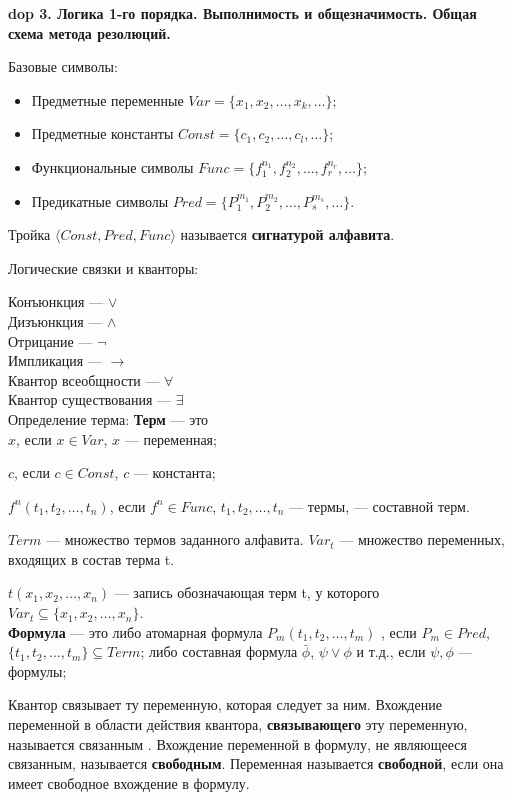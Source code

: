 \textbf{\LARGE dop 3. Логика 1-го порядка.  Выполнимость и общезначимость. Общая схема метода резолюций.}

Базовые символы: 
\begin{itemize}
    \item Предметные переменные $Var = \{x_1, x_2, \ldots, x_k, \ldots\}$;
    \item Предметные константы $Const = \{c_1, c_2,\ldots, c_l,\ldots\}$;
    \item Функциональные символы $Func = \{f^{n_1}_1,f^{n_2}_2,\ldots, f^{n_r}_r,\ldots\}$;
    \item Предикатные символы $Pred = \{P^{m_1}_1,P^{m_2}_2, \ldots, P^{m_s}_s,\ldots\}$.
\end{itemize}
Тройка $\langle Const,Pred,Func\rangle$ называется \textbf{сигнатурой алфавита}.

Логические связки и кванторы: 

Конъюнкция --- $\vee$ \\
Дизъюнкция --- $ \wedge $ \\
Отрицание --- $ \lnot $ \\
Импликация --- $ \longrightarrow $ \\
Квантор всеобщности --- $ \forall $ \\
Квантор существования --- $\exists$ \\


Определение терма: 
\textbf{Терм} --- это \\
$x$, если $x \in Var$, $x$ --- переменная;

$c$, если $c \in Const$, $c$ --- константа;

$f^n(t_1, t_2,\ldots, t_n)$,  если $f^n \in Func$, $t_1, t_2,\ldots, t_n$ --- термы, --- составной терм.

$Term$ --- множество термов заданного алфавита.
$Var_t$ --- множество переменных, входящих в состав терма t.

$t(x_1, x_2,\ldots, x_n)$ --- запись обозначающая терм t, у которого ${Var}_t \subseteq \{x_1, x_2,\ldots, x_n\}$.\\

\textbf{Формула} --- это либо атомарная формула
$P_m(t_1, t_2,\ldots, t_m)$ , если $ P_m \in Pred $, $\{t_1, t_2,\ldots, t_m\} \subseteq Term $; 
либо составная формула
$\bar{\phi}$, $\psi \vee \phi$ и т.д., если $\psi, \phi$ — формулы; 

Квантор связывает ту переменную, которая следует за ним.
Вхождение переменной в области действия квантора, \textbf{связывающего} эту переменную, называется связанным .
Вхождение переменной в формулу, не являющееся связанным, называется \textbf{свободным}.
Переменная называется \textbf{свободной}, если она имеет свободное вхождение в формулу.

